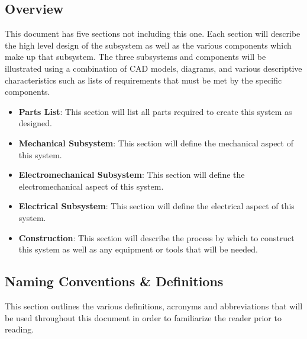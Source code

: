 \documentclass[titlepage]{article}
\begin{document}
\subsection{Overview}
This document has five sections not including this one. Each section will describe the high level design of the subsystem as well as the various components which make up that subsystem. The three subsystems and components will be illustrated using a combination of CAD models, diagrams, and various descriptive characteristics such as lists of requirements that must be met by the specific components.\\
\begin{itemize}
	\item \textbf{Parts List}: This section will list all parts required to create this system as designed.\\
	\item \textbf{Mechanical Subsystem}: This section will define the mechanical aspect of this system.\\
	\item \textbf{Electromechanical Subsystem}: This section will define the electromechanical aspect of this system.\\
	\item \textbf{Electrical Subsystem}: This section will define the electrical aspect of this system.\\
	\item \textbf{Construction}: This section will describe the process by which to construct this system as well as any equipment or tools that will be needed.\\
\end{itemize}
\subsection{Naming Conventions \& Definitions}
This section outlines the various definitions, acronyms and abbreviations that will be used throughout this document in order to familiarize the reader prior to reading.
\newpage
\end{document}

